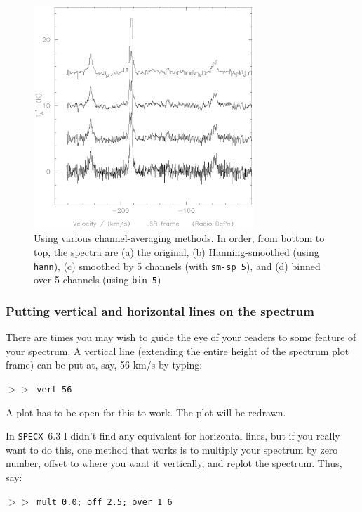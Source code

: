 \documentclass[11pt,twoside]{article}
\newcommand{\SPECX}{{\tt SPECX}}
\newcommand{\SP}{{$>\!>$}}
\begin{document}
\begin{figure}[htb]
\centering
\includegraphics[height=3.3in]{sc8_smooth.ps}
\vspace*{-0.5cm}
\begin{center}
\begin{minipage}[t]{4.5in}
\caption[Binning and smoothing spectra]
{\small{Using various channel-averaging methods. In order, from bottom
to top, the spectra are (a) the original, (b) Hanning-smoothed (using
{\tt hann}), (c) smoothed by 5 channels (with {\tt sm-sp 5}), and (d)
binned over 5 channels (using {\tt bin 5})} }
\label{fig:specx_smooth}
\end{minipage}
\end{center}
\end{figure}

\subsubsection{Putting vertical and horizontal lines on the spectrum}
\label{sec:specx_lines}
There are times you may wish to guide the eye of your readers to some
feature of your spectrum. A vertical line (extending the entire height
of the spectrum plot frame) can be put at, say, 56 km/s by typing:

\SP\ \verb|vert 56|

A plot has to be open for this to work. The plot will be redrawn.

In \SPECX\ 6.3 I didn't find any equivalent for horizontal
lines, but if you really want to do
this, one method that works is to multiply your spectrum by zero
number, offset to where you want it vertically, and replot the
spectrum. Thus, say:

\SP\ \verb|mult 0.0; off 2.5; over 1 6|
\end{document}
